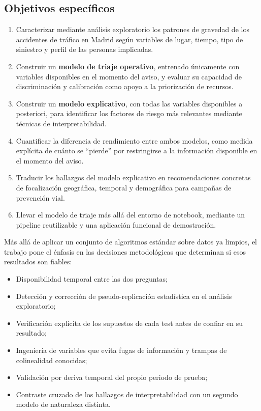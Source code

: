 \documentclass[11pt,a4paper]{article}
\begin{document}
\subsection{Objetivos específicos}

\begin{enumerate}[nosep]
\item Caracterizar mediante análisis exploratorio los patrones de gravedad de los accidentes de tráfico en Madrid según variables de lugar, tiempo, tipo de siniestro y perfil de las personas implicadas.
\item Construir un \textbf{modelo de triaje operativo}, entrenado únicamente con variables disponibles en el momento del aviso, y evaluar su capacidad de discriminación y calibración como apoyo a la priorización de recursos.
\item Construir un \textbf{modelo explicativo}, con todas las variables disponibles a posteriori, para identificar los factores de riesgo más relevantes mediante técnicas de interpretabilidad.
\item Cuantificar la diferencia de rendimiento entre ambos modelos, como medida explícita de cuánto se ``pierde'' por restringirse a la información disponible en el momento del aviso.
\item Traducir los hallazgos del modelo explicativo en recomendaciones concretas de focalización geográfica, temporal y demográfica para campañas de prevención vial.
\item Llevar el modelo de triaje más allá del entorno de notebook, mediante un pipeline reutilizable y una aplicación funcional de demostración.
\end{enumerate}

Más allá de aplicar un conjunto de algoritmos estándar sobre datos ya limpios, el trabajo pone el énfasis en las decisiones metodológicas que determinan si esos resultados son fiables:

\begin{itemize}[nosep]
\item Disponibilidad temporal entre las dos preguntas;
\item Detección y corrección de pseudo-replicación estadística en el análisis exploratorio;
\item Verificación explícita de los supuestos de cada test antes de confiar en su resultado;
\item Ingeniería de variables que evita fugas de información y trampas de colinealidad conocidas;
\item Validación por deriva temporal del propio periodo de prueba;
\item Contraste cruzado de los hallazgos de interpretabilidad con un segundo modelo de naturaleza distinta.
\end{itemize}
\end{document}
